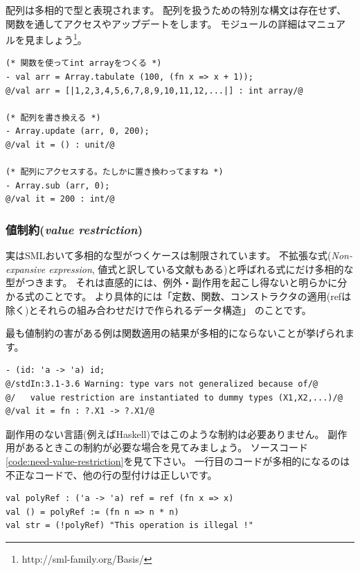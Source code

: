 \documentclass[11pt,a4paper]{jarticle}
\begin{document}
配列は多相的で型と表現されます。
配列を扱うための特別な構文は存在せず、関数を通してアクセスやアップデートをします。
モジュールの詳細はマニュアルを見ましょう\footnote{http://sml-family.org/Basis/}。

\begin{lstlisting}[caption=配列の扱い,label=code:array]
(* 関数を使ってint arrayをつくる *)
- val arr = Array.tabulate (100, (fn x => x + 1));
@/val arr = [|1,2,3,4,5,6,7,8,9,10,11,12,...|] : int array/@

(* 配列を書き換える *)
- Array.update (arr, 0, 200);
@/val it = () : unit/@

(* 配列にアクセスする。たしかに置き換わってますね *)
- Array.sub (arr, 0);
@/val it = 200 : int/@
\end{lstlisting}

\subsubsection{値制約(\textit{value restriction})}

実はSMLおいて多相的な型がつくケースは制限されています。
不拡張な式(\textit{Non-expansive expression}, 値式と訳している文献もある)と呼ばれる式にだけ多相的な型がつきます。
それは直感的には、例外・副作用を起こし得ないと明らかに分かる式のことです。
より具体的には「定数、関数、コンストラクタの適用(refは除く)とそれらの組み合わせだけで作られるデータ構造」
のことです。

最も値制約の害がある例は関数適用の結果が多相的にならないことが挙げられます。

\begin{lstlisting}[caption=値制約,label=code:value-description]
- (id: 'a -> 'a) id;
@/stdIn:3.1-3.6 Warning: type vars not generalized because of/@
@/   value restriction are instantiated to dummy types (X1,X2,...)/@
@/val it = fn : ?.X1 -> ?.X1/@
\end{lstlisting}

副作用のない言語(例えばHaskell)ではこのような制約は必要ありません。
副作用があるときこの制約が必要な場合を見てみましょう。
ソースコード\ref{code:need-value-restriction}を見て下さい。
一行目のコードが多相的になるのは不正なコードで、他の行の型付けは正しいです。

\begin{lstlisting}[caption=値制約が必要なケース(不正なコード、動かない),label=code:need-value-restriction]
val polyRef : ('a -> 'a) ref = ref (fn x => x)
val () = polyRef := (fn n => n * n)
val str = (!polyRef) "This operation is illegal !"
\end{lstlisting}
\end{document}
